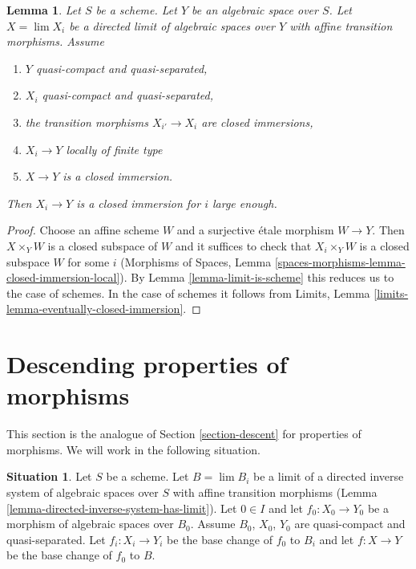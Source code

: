 \documentclass{stacks-project}
\theoremstyle{plain}
\newtheorem{lemma}[subsection]{Lemma}
\theoremstyle{definition}
\newtheorem{situation}[subsection]{Situation}
\theoremstyle{remark}
\numberwithin{equation}{subsection}
\def\lim{\mathop{\mathrm{lim}}\nolimits}
\begin{document}
\begin{lemma}
\label{lemma-eventually-closed-immersion}
Let $S$ be a scheme. Let $Y$ be an algebraic space over $S$.
Let $X = \lim X_i$ be a directed limit of algebraic spaces
over $Y$ with affine transition morphisms. Assume
\begin{enumerate}
\item $Y$ quasi-compact and quasi-separated,
\item $X_i$ quasi-compact and quasi-separated,
\item the transition morphisms $X_{i'} \to X_i$ are closed immersions,
\item $X_i \to Y$ locally of finite type
\item $X \to Y$ is a closed immersion.
\end{enumerate}
Then $X_i \to Y$ is a closed immersion for $i$ large enough.
\end{lemma}

\begin{proof}
Choose an affine scheme $W$ and a surjective \'etale morphism $W \to Y$.
Then $X \times_Y W$ is a closed subspace of $W$ and it suffices to check
that $X_i \times_Y W$ is a closed subspace $W$ for some $i$
(Morphisms of Spaces,
Lemma \ref{spaces-morphisms-lemma-closed-immersion-local}). By
Lemma \ref{lemma-limit-is-scheme} this reduces us to the case of schemes.
In the case of schemes it follows from
Limits, Lemma \ref{limits-lemma-eventually-closed-immersion}.
\end{proof}

















\section{Descending properties of morphisms}
\label{section-descent-of-properties}

\noindent
This section is the analogue of Section \ref{section-descent}
for properties of morphisms. We will work in the following situation.

\begin{situation}
\label{situation-descent-property}
Let $S$ be a scheme. Let $B = \lim B_i$ be a limit of a directed inverse system
of algebraic spaces over $S$ with affine transition morphisms
(Lemma \ref{lemma-directed-inverse-system-has-limit}).
Let $0 \in I$ and let $f_0 : X_0 \to Y_0$ be a morphism of algebraic spaces
over $B_0$. Assume $B_0$, $X_0$, $Y_0$ are quasi-compact and quasi-separated.
Let $f_i : X_i \to Y_i$ be the base change of $f_0$ to $B_i$ and
let $f : X \to Y$ be the base change of $f_0$ to $B$.
\end{situation}
\end{document}
